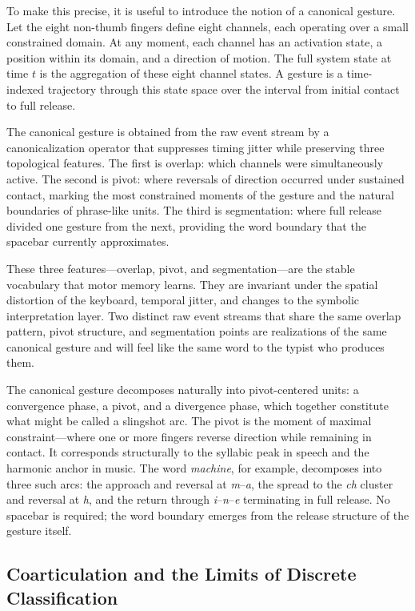 \documentclass[12pt,a4paper]{article}
\theoremstyle{plain}
\theoremstyle{definition}
\theoremstyle{remark}
\begin{document}
To make this precise, it is useful to introduce the notion of a canonical
gesture. Let the eight non-thumb fingers define eight channels, each operating
over a small constrained domain. At any moment, each channel has an activation
state, a position within its domain, and a direction of motion. The full system
state at time $t$ is the aggregation of these eight channel states. A gesture
is a time-indexed trajectory through this state space over the interval from
initial contact to full release.

The canonical gesture is obtained from the raw event stream by a
canonicalization operator that suppresses timing jitter while preserving three
topological features. The first is overlap: which channels were simultaneously
active. The second is pivot: where reversals of direction occurred under
sustained contact, marking the most constrained moments of the gesture and the
natural boundaries of phrase-like units. The third is segmentation: where full
release divided one gesture from the next, providing the word boundary that the
spacebar currently approximates.

These three features---overlap, pivot, and segmentation---are the stable
vocabulary that motor memory learns. They are invariant under the spatial
distortion of the keyboard, temporal jitter, and changes to the symbolic
interpretation layer. Two distinct raw event streams that share the same
overlap pattern, pivot structure, and segmentation points are realizations of
the same canonical gesture and will feel like the same word to the typist who
produces them.

The canonical gesture decomposes naturally into pivot-centered units: a
convergence phase, a pivot, and a divergence phase, which together constitute
what might be called a slingshot arc. The pivot is the moment of maximal
constraint---where one or more fingers reverse direction while remaining in
contact. It corresponds structurally to the syllabic peak in speech and the
harmonic anchor in music. The word \textit{machine}, for example, decomposes
into three such arcs: the approach and reversal at \textit{m}--\textit{a},
the spread to the \textit{ch} cluster and reversal at \textit{h}, and the
return through \textit{i}--\textit{n}--\textit{e} terminating in full release.
No spacebar is required; the word boundary emerges from the release structure
of the gesture itself.

\subsection{Coarticulation and the Limits of Discrete Classification}
\end{document}

